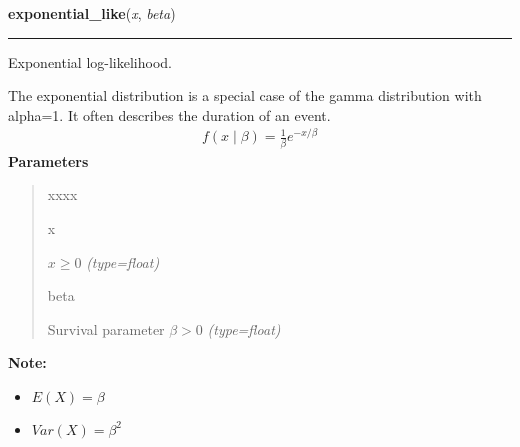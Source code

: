 \hspace{.8\funcindent}\begin{boxedminipage}{\funcwidth}

    \raggedright \textbf{exponential\_like}(\textit{x}, \textit{beta})

    \vspace{-1.5ex}

    \rule{\textwidth}{0.5\fboxrule}
\setlength{\parskip}{2ex}

Exponential log-likelihood.

The exponential distribution is a special case of the gamma distribution
with alpha=1. It often describes the duration of an event.
\begin{equation*}\begin{split}f(x \mid \beta) = \frac{1}{\beta}e^{-x/\beta}\end{split}\end{equation*}\setlength{\parskip}{1ex}
      \textbf{Parameters}
      \vspace{-1ex}

      \begin{quote}
        \begin{Ventry}{xxxx}

          \item[x]


$x \ge 0$
            {\it (type=float)}

          \item[beta]


Survival parameter $\beta > 0$
            {\it (type=float)}

        \end{Ventry}

      \end{quote}

\textbf{Note:} \begin{itemize}
\item {} 
$E(X) = \beta$

\item {} 
$Var(X) = \beta^2$

\end{itemize}


    \end{boxedminipage}

    \label{pymc:distributions:exponweib_like}

    \vspace{0.5ex}

